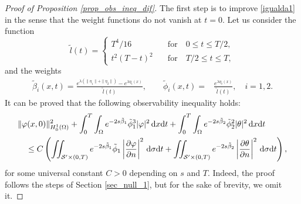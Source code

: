 \documentclass{aims}
\theoremstyle{definition}
\def\dx{\,\textnormal{d}x}
\def\dt{\textnormal{d}t}
\def\d{\,\textnormal{d}}
\begin{document}
\begin{proof}[Proof of Proposition \ref{prop_obs_ineq_dif}]
 The first step is to improve \eqref{igualda1} in the sense that the weight functions do not vanish at $t=0$. Let us consider the function
 \begin{equation*}
 \widetilde{l}(t)=
 \begin{cases}
 T^4/16 \quad &\text{for}\quad 0\leq t\leq T/2, \\
 t^2(T-t)^2 \quad &\text{for}\quad T/2\leq t\leq T,
 \end{cases}
 \end{equation*}
 and the weights
 \begin{equation*}
\begin{split}
\tilde{\beta}_i(x,t)=\frac{e^{\lambda(\|\eta_1\|+\|\eta_2\|)}-e^{\lambda \eta_i(x)}}{\widetilde{l}(t)}, \qquad \tilde{\phi}_i(x,t)=&\frac{e^{\lambda\eta_i(x)}}{\widetilde{l}(t)}, \quad i=1,2.
\end{split}\end{equation*}
It can be proved that the following observability inequality holds:
\begin{equation}
\label{aux7}
\begin{split}
&\|\varphi(x,0)\|_{H_0^1(\Omega)}^2+\int_0^{T}\int_{\Omega}e^{-2s\tilde \beta_1}\tilde \phi_1^{3}|\varphi|^2\dx\dt+\int_0^{T}\int_{\Omega}e^{-2s\tilde \beta_2}\tilde \phi_2^{2}|\theta|^2\dx\dt\\
&\quad \leq C\left(\iint_{\mathcal S^\prime\times(0,T)}e^{-2s\tilde \beta_1}\tilde \phi_1\left|\frac{\partial \varphi}{\partial n}\right|^2\d\sigma\dt+\iint_{\mathcal S^{\prime}\times(0,T)}e^{-2s\tilde \beta_2}\left|\frac{\partial \theta}{\partial n}\right|^2\d\sigma\dt\right),
\end{split}
\end{equation}
 for some universal constant $C>0$ depending on $s$ and $T$. Indeed, the proof follows the steps of Section \ref{sec_null_1}, but for the sake of brevity, we omit it. 
 

\end{proof}
\end{document}
